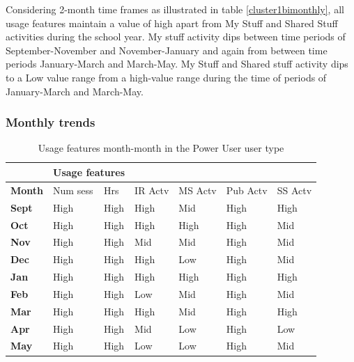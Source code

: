 \documentclass{acm_proc_article-sp}
\begin{document}
Considering 2-month time frames as illustrated in table \ref{cluster1bimonthly}, all usage features maintain a value of high apart from My Stuff and Shared Stuff activities during the school year. My stuff activity dips between time periods of September-November and November-January and again from between time periods January-March and March-May.
My Stuff and Shared stuff activity dips to a Low value range from a high-value range during the time of periods of January-March and March-May.

\subsubsection{Monthly trends}
\begin{table}
\caption{Usage features month-month in the Power User user type}
\label{cluster1month}
\begin{tabular}{|p{1.5cm}|p{0.6cm}|p{0.6cm}|p{0.6cm}|p{0.6cm}|p{0.8cm}|p{0.8cm}|}
& \multicolumn{2}{r}{\textbf{Usage features}}  \\ \hline
 \textbf{Month} 
 & Num sess & Hrs & IR Actv & MS Actv & Pub Actv & SS Actv \\ \hline
\textbf{Sept} & High                                   & High  & High        & Mid             & High           & High                \\ \hline
\textbf{Oct}   & High                                   & High  & High        & High            & High           & Mid                 \\ \hline
\textbf{Nov}  & High                                   & High  & Mid         & Mid             & High           & Mid                 \\ \hline
\textbf{Dec}  & High                                   & High  & High        & Low             & High           & Mid                 \\ \hline
\textbf{Jan}   & High                                   & High  & High        & High            & High           & High                \\ \hline
\textbf{Feb}  & High                                   & High  & Low         & Mid             & High           & Mid                 \\ \hline
\textbf{Mar}     & High                                   & High  & High        & Mid             & High           & High                \\ \hline
\textbf{Apr}     & High                                   & High  & Mid         & Low             & High           & Low                 \\ \hline
\textbf{May}       & High                                   & High  & Low         & Low             & High           & Mid         \\  \hline     
\end{tabular}
\end{table}
\end{document}
